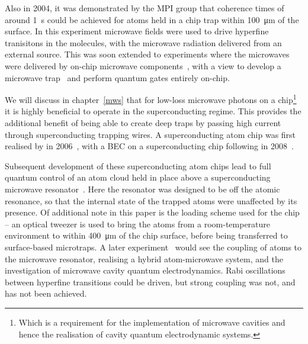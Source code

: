 
Also in 2004, it was demonstrated by the MPI group that coherence times 
of around \SI{1}{\second} could be achieved for \esRb{} atoms held in a chip
trap within \SI{100}{\micro\meter} of the surface. In this experiment microwave
fields were used to drive hyperfine tranisitons in the molecules, with the
microwave radiation delivered from an external source. This was soon extended to
experiments where the microwaves were delivered by on-chip microwave
components~\cite{Treutlein2008, Boehi2009}, with a view to develop a microwave
trap~\cite{} and perform quantum gates entirely on-chip.

We will discuss in chapter~\ref{mws} that for low-loss microwave photons on a
chip\footnote{Which is a requirement for the implementation of microwave
  cavities and hence the realisation of cavity quantum electrodynamic systems.}
it is highly beneficial to operate in the superconducting regime. This provides
the additional benefit of being able to create deep traps by passing high
current through superconducting trapping wires. A superconducting atom chip was
first realised by  in 2006~\cite{Nirrengarten2006}, with
a BEC on a superconducting chip following in 2008~\cite{Roux2008}.

Subsequent development of these superconducting atom chips lead to full quantum
control of an atom cloud held in place above a superconducting microwave
resonator~\cite{Bernon2013}. Here the resonator was designed to be
off the atomic resonance, so that the internal state of the trapped atoms were
unaffected by its presence. Of additional note in this paper is the loading
scheme used for the chip -- an optical tweezer is used to bring the atoms from
a room-temperature environment to within \SI{400}{\micro\meter} of the chip
surface, before being transferred to surface-based microtraps.
%
A later experiment~\cite{Hatterman2017} would see the coupling of atoms to the
microwave resonator, realising a hybrid atom-microwave system, and the
investigation of microwave cavity quantum electrodynamics. Rabi oscillations
between hyperfine transitions could be driven, but strong coupling was not, and
has not been achieved.
%

